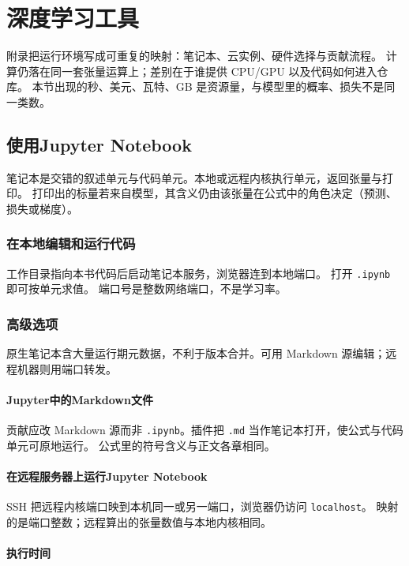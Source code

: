 \chapter{深度学习工具}

附录把运行环境写成可重复的映射：笔记本、云实例、硬件选择与贡献流程。
计算仍落在同一套张量运算上；差别在于谁提供 CPU/GPU 以及代码如何进入仓库。
本节出现的秒、美元、瓦特、GB 是资源量，与模型里的概率、损失不是同一类数。

\section{使用Jupyter Notebook}

笔记本是交错的叙述单元与代码单元。本地或远程内核执行单元，返回张量与打印。
打印出的标量若来自模型，其含义仍由该张量在公式中的角色决定（预测、损失或梯度）。

\subsection{在本地编辑和运行代码}

工作目录指向本书代码后启动笔记本服务，浏览器连到本地端口。
打开 \texttt{.ipynb} 即可按单元求值。
端口号是整数网络端口，不是学习率。

\subsection{高级选项}

原生笔记本含大量运行期元数据，不利于版本合并。可用 Markdown 源编辑；远程机器则用端口转发。

\subsubsection{Jupyter中的Markdown文件}

贡献应改 Markdown 源而非 \texttt{.ipynb}。插件把 \texttt{.md} 当作笔记本打开，使公式与代码单元可原地运行。
公式里的符号含义与正文各章相同。

\subsubsection{在远程服务器上运行Jupyter Notebook}

SSH 把远程内核端口映到本机同一或另一端口，浏览器仍访问 \texttt{localhost}。
映射的是端口整数；远程算出的张量数值与本地内核相同。

\subsubsection{执行时间}

